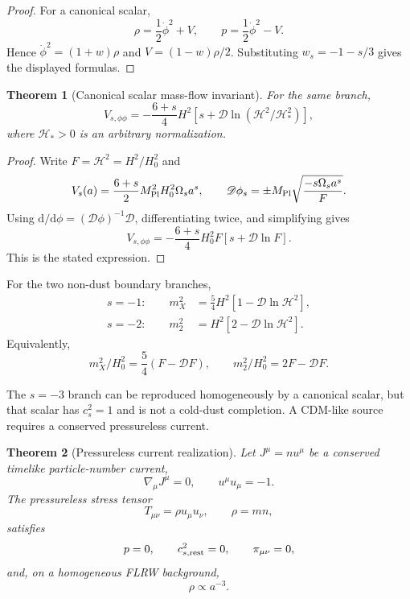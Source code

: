 \documentclass[aps,prd,reprint,onecolumn,nofootinbib,superscriptaddress,showkeys]{revtex4-2}
\numberwithin{equation}{section}
\theoremstyle{definition}
\theoremstyle{plain}
\newtheorem{theorem}{Theorem}[section]
\newcommand{\dd}{\mathrm d}
\newcommand{\Dil}{\mathscr D}
\begin{document}
\begin{proof}
For a canonical scalar,
\[
\rho=\frac12\dot\phi^2+V,
\qquad
p=\frac12\dot\phi^2-V.
\]
Hence \(\dot\phi^2=(1+w)\rho\) and \(V=(1-w)\rho/2\).  Substituting \(w_s=-1-s/3\) gives the displayed formulas.
\end{proof}

\begin{theorem}[Canonical scalar mass-flow invariant]
For the same branch,
\begin{equation}
\boxed{
V_{s,\phi\phi}
=
-\frac{6+s}{4}H^2
\left[
s+\Dil\ln(\mathcal H^2/\mathcal H_*^2)
\right],
}
\end{equation}
where \(\mathcal H_*>0\) is an arbitrary normalization.
\end{theorem}

\begin{proof}
Write \(F=\mathcal H^2=H^2/H_0^2\) and
\[
V_s(a)=\frac{6+s}{2}M_{\rm Pl}^2H_0^2\Omega_sa^s,
\qquad
\Dil\phi_s=\pm M_{\rm Pl}\sqrt{\frac{-s\Omega_sa^s}{F}}.
\]
Using \(\dd/\dd\phi=(\Dil\phi)^{-1}\Dil\), differentiating twice, and simplifying gives
\[
V_{s,\phi\phi}
=
-\frac{6+s}{4}H_0^2F
\left[s+\Dil\ln F\right].
\]
This is the stated expression.
\end{proof}

For the two non-dust boundary branches,
\begin{align}
s=-1:\qquad
m_X^2&=\frac54H^2\left[1-\Dil\ln \mathcal H^2\right],\\
s=-2:\qquad
m_2^2&=H^2\left[2-\Dil\ln \mathcal H^2\right].
\end{align}
Equivalently,
\begin{equation}
m_X^2/H_0^2=\frac54(F-\Dil F),
\qquad
m_2^2/H_0^2=2F-\Dil F.
\end{equation}

The \(s=-3\) branch can be reproduced homogeneously by a canonical scalar, but that scalar has \(c_s^2=1\) and is not a cold-dust completion.  A CDM-like source requires a conserved pressureless current.

\begin{theorem}[Pressureless current realization]
Let \(J^\mu=nu^\mu\) be a conserved timelike particle-number current,
\begin{equation}
\nabla_\mu J^\mu=0,
\qquad
u^\mu u_\mu=-1.
\end{equation}
The pressureless stress tensor
\begin{equation}
T_{\mu\nu}=\rho u_\mu u_\nu,
\qquad
\rho=mn,
\end{equation}
satisfies
\begin{equation}
p=0,
\qquad
c_{s,\rm rest}^2=0,
\qquad
\pi_{\mu\nu}=0,
\end{equation}
and, on a homogeneous FLRW background,
\begin{equation}
\rho\propto a^{-3}.
\end{equation}
\end{theorem}
\end{document}
